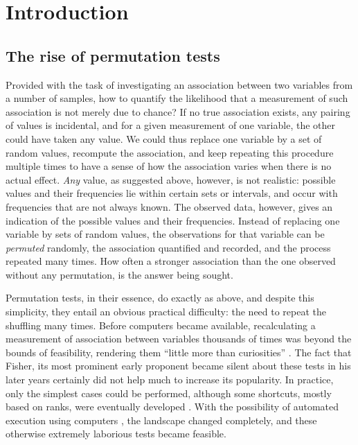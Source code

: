 \chapter{Introduction}
\label{sec:intro}
\setstretch{\lspac}

\section{The rise of permutation tests}

Provided with the task of investigating an association between two variables from a number of samples, how to quantify the likelihood that a measurement of such association is not merely due to chance? If no true association exists, any pairing of values is incidental, and for a given measurement of one variable, the other could have taken any value. We could thus replace one variable by a set of random values, recompute the association, and keep repeating this procedure multiple times to have a sense of how the association varies when there is no actual effect. \emph{Any} value, as suggested above, however, is not realistic: possible values and their frequencies lie within certain sets or intervals, and occur with frequencies that are not always known. The observed data, however, gives an indication of the possible values and their frequencies. Instead of replacing one variable by sets of random values, the observations for that variable can be \emph{permuted} randomly, the association quantified and recorded, and the process repeated many times. How often a stronger association than the one observed without any permutation, is the answer being sought.

Permutation tests, in their essence, do exactly as above, and despite this simplicity, they entail an obvious practical difficulty: the need to repeat the shuffling many times. Before computers became available, recalculating a measurement of association between variables thousands of times was beyond the bounds of feasibility, rendering them ``little more than curiosities'' \citep{Bradley1968}. The fact that Fisher, its most prominent early proponent \citep{Fisher1935} became silent about these tests in his later years \citep{Basu1980} certainly did not help much to increase its popularity. In practice, only the simplest cases could be performed, although some shortcuts, mostly based on ranks, were eventually developed \citep{Mann1947, Wilcoxon1945, Box1955}. With the possibility of automated execution using computers \citep{Efron1979}, the landscape changed completely, and these otherwise extremely laborious tests became feasible.

